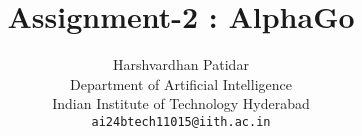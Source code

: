 \documentclass[44pt]{article}
\title{Assignment-2 : AlphaGo}
\author{Harshvardhan Patidar\\
  Department of Artificial Intelligence\\
  Indian Institute of Technology Hyderabad\\
  \texttt{ai24btech11015@iith.ac.in}
}
\begin{document}
\



\maketitle






















\end{document}
